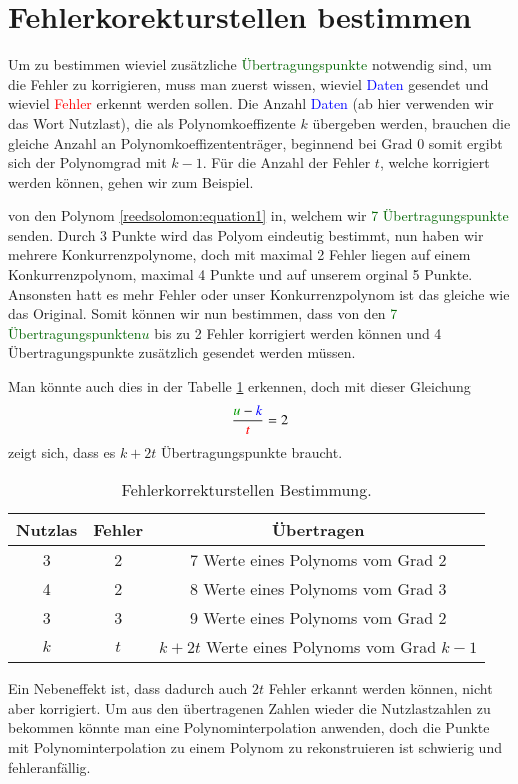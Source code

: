 \section{Fehlerkorekturstellen bestimmen
\label{reedsolomon:section:Fehlerkorrekturstellen}}
Um zu bestimmen wieviel zusätzliche \textcolor{darkgreen}{Übertragungspunkte} notwendig sind, um die Fehler zu korrigieren,
muss man zuerst wissen, wieviel \textcolor{blue}{Daten} gesendet und wieviel \textcolor{red}{Fehler} erkennt werden sollen. 
Die Anzahl \textcolor{blue}{Daten} (ab hier verwenden wir das Wort Nutzlast), die als Polynomkoeffizente $k$ übergeben werden, 
brauchen die gleiche Anzahl an Polynomkoeffizententräger, beginnend bei Grad 0 somit ergibt sich der Polynomgrad mit $k-1$.
Für die Anzahl der Fehler $t$, welche korrigiert werden können, gehen wir zum Beispiel.
\begin{beispiel} von den Polynom \ref{reedsolomon:equation1} in, welchem wir  \textcolor{darkgreen}{7 Übertragungspunkte} senden.
Durch 3 Punkte wird das Polyom eindeutig bestimmt, nun haben wir mehrere Konkurrenzpolynome, doch mit maximal 2 Fehler liegen auf einem Konkurrenzpolynom,
maximal 4 Punkte und auf unserem orginal 5 Punkte. Ansonsten hatt es mehr Fehler oder unser Konkurrenzpolynom ist das gleiche wie das Original. 
Somit können wir nun bestimmen, dass von den \textcolor{darkgreen}{7 Übertragungspunkten$u$} bis zu 2 Fehler korrigiert werden können und 4 Übertragungspunkte zusätzlich gesendet werden müssen.
\end{beispiel}
Man könnte auch dies in der Tabelle \ref{tab:fehlerkorrekturstellen} erkennen, doch mit dieser Gleichung
\begin{equation}
    \frac{\textcolor{darkgreen}{u}-\textcolor{blue}{k}}{\textcolor{red}{t}}
    =2
    \label{reedsolomon:equation2}
\end{equation}
zeigt sich, dass es $k+2t$ Übertragungspunkte braucht.

\begin{table}
    \centering
    \begin{tabular}{ c c | c} 
        \hline
        Nutzlas & Fehler & Übertragen \\
        \hline 
        3 & 2 & 7 Werte eines Polynoms vom Grad 2 \\ 
        4 & 2 & 8 Werte eines Polynoms vom Grad 3 \\
        3 & 3 & 9 Werte eines Polynoms vom Grad 2 \\ 
        \hline
        $k$ & $t$ & $k+2t$ Werte eines Polynoms vom Grad $k-1$ \\ 
        \hline
    \end{tabular}
    \caption{ Fehlerkorrekturstellen Bestimmung.}
    \label{tab:fehlerkorrekturstellen}
\end{table}

Ein Nebeneffekt ist, dass dadurch auch $2t$ Fehler erkannt werden können, nicht aber korrigiert.
Um aus den übertragenen Zahlen wieder die Nutzlastzahlen zu bekommen könnte man eine Polynominterpolation anwenden,
doch die Punkte mit Polynominterpolation zu einem Polynom zu rekonstruieren ist schwierig und fehleranfällig.

